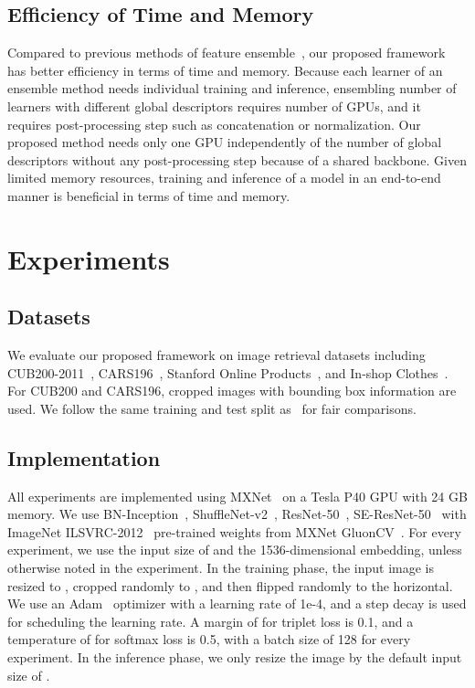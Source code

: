 \documentclass[10pt,twocolumn,letterpaper]{article}
\begin{document}
\begin{CJK}{UTF8}{mj}
\subsection{Efficiency of Time and Memory}
Compared to previous methods of feature ensemble~\cite{ozaki2019large, chen20192nd, lin2018regional}, our proposed framework has better efficiency in terms of time and memory.
Because each learner of an ensemble method needs individual training and inference, ensembling  number of learners with different global descriptors requires  number of GPUs, and it requires post-processing step such as concatenation or normalization.
Our proposed method needs only one GPU independently of the number of global descriptors without any post-processing step because of a shared backbone.
Given limited memory resources, training and inference of a model in an end-to-end manner is beneficial in terms of time and memory.


\section{Experiments}


\subsection{Datasets}

We evaluate our proposed framework on image retrieval datasets including CUB200-2011~\cite{wah2011caltech}, CARS196~\cite{krause20133d}, Stanford Online Products~\cite{oh2016deep}, and In-shop Clothes~\cite{liu2016deepfashion}.
For CUB200 and CARS196, cropped images with bounding box information are used.
We follow the same training and test split as~\cite{dai2018batch, Kim_2018_ECCV, zhai2018making} for fair comparisons.

\subsection{Implementation}

All experiments are implemented using MXNet~\cite{chen2015mxnet} on a Tesla P40 GPU with 24 GB memory.
We use BN-Inception~\cite{ioffe2015batch}, ShuffleNet-v2~\cite{ma2018shufflenet}, ResNet-50~\cite{he2016deep}, SE-ResNet-50~\cite{hu2018squeeze} with ImageNet ILSVRC-2012~\cite{deng2009imagenet} pre-trained weights from MXNet GluonCV~\cite{gluoncv}.
For every experiment, we use the input size of  and the 1536-dimensional embedding, unless otherwise noted in the experiment.
In the training phase, the input image is resized to , cropped randomly to , and then flipped randomly to the horizontal.
We use an Adam~\cite{kingma2014adam} optimizer with a learning rate of 1e-4, and a step decay is used for scheduling the learning rate.
A margin of  for triplet loss is 0.1, and a temperature of  for softmax loss is 0.5, with a batch size of 128 for every experiment.
In the inference phase, we only resize the image by the default input size of .



\end{CJK}
\end{document}
